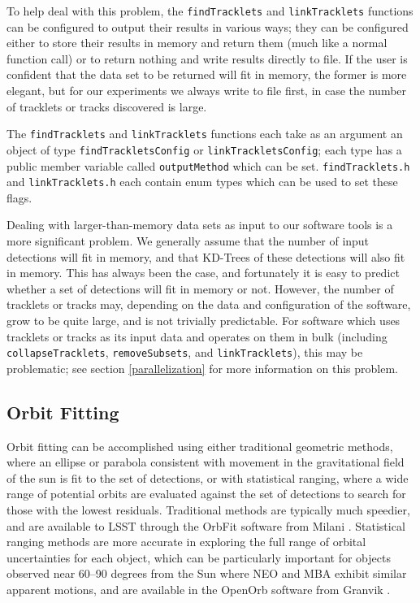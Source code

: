 To help deal with this problem, the {\tt  findTracklets} and
{\tt linkTracklets} functions can be configured to output their results
in various ways; they can be configured either to store their results
in memory and return them (much like a normal function call) or to
return nothing and write results directly to file.  If the user is
confident that the data set to be returned will fit in memory, the
former is more elegant, but for our experiments we always write to
file first, in case the number of tracklets or tracks discovered is
large.

The {\tt findTracklets} and {\tt linkTracklets} functions each take as
an argument an object of type {\tt findTrackletsConfig} or
{\tt linkTrackletsConfig}; each type has a public member variable
called {\tt outputMethod} which can be set.  {\tt findTracklets.h} and
{\tt linkTracklets.h} each contain enum types which can be used to set
these flags.

Dealing with larger-than-memory data sets as input to our software
tools is a more significant problem.  We generally assume that the
number of input detections will fit in memory, and that KD-Trees of
these detections will also fit in memory.  This has always been the
case, and fortunately it is easy to predict whether a set of
detections will fit in memory or not.  However, the number of
tracklets or tracks may, depending on the data and configuration of
the software, grow to be quite large, and is not trivially
predictable.  For software which uses tracklets or tracks as its input
data and operates on them in bulk (including {\tt collapseTracklets},
{\tt removeSubsets}, and {\tt linkTracklets}), this may be problematic;
see section \ref{parallelization} for more information on this
problem.




\subsection{Orbit Fitting}
\label{orbitFitting}

Orbit fitting can be accomplished using either traditional geometric
methods, where an ellipse or parabola consistent with movement in the
gravitational field of the sun is fit to the set of detections, or
with statistical ranging, where a wide range of potential orbits are
evaluated against the set of detections to search for those with
the lowest residuals. Traditional methods are typically much speedier,
and are available to LSST through the OrbFit software from Milani
\citep{Milani2006}. Statistical ranging methods are more accurate in
exploring the full range of orbital uncertainties for each object,
which can be particularly important for objects observed near 60--90
degrees from the Sun where NEO and MBA exhibit similar apparent
motions, and are available in the OpenOrb software from Granvik
\citep{OpenOrb2009}.

